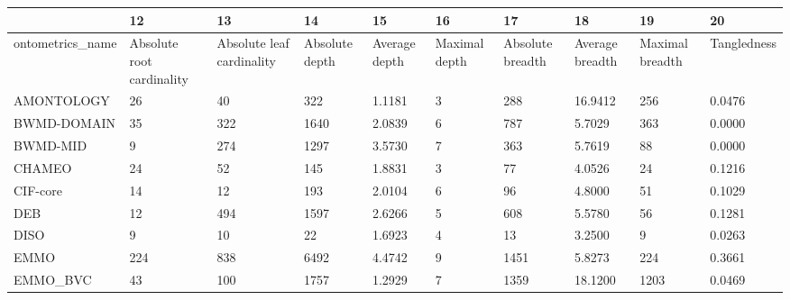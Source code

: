\begin{tabular}{llllllllll}
\toprule
{} &                         12 &                         13 &              14 &             15 &             16 &                17 &               18 &               19 &           20 \\
\midrule
ontometrics\_name        &  Absolute root cardinality &  Absolute leaf cardinality &  Absolute depth &  Average depth &  Maximal depth &  Absolute breadth &  Average breadth &  Maximal breadth &  Tangledness \\
AMONTOLOGY              &                         26 &                         40 &             322 &         1.1181 &              3 &               288 &          16.9412 &              256 &       0.0476 \\
BWMD-DOMAIN             &                         35 &                        322 &            1640 &         2.0839 &              6 &               787 &           5.7029 &              363 &       0.0000 \\
BWMD-MID                &                          9 &                        274 &            1297 &         3.5730 &              7 &               363 &           5.7619 &               88 &       0.0000 \\
CHAMEO                  &                         24 &                         52 &             145 &         1.8831 &              3 &                77 &           4.0526 &               24 &       0.1216 \\
CIF-core                &                         14 &                         12 &             193 &         2.0104 &              6 &                96 &           4.8000 &               51 &       0.1029 \\
DEB                     &                         12 &                        494 &            1597 &         2.6266 &              5 &               608 &           5.5780 &               56 &       0.1281 \\
DISO                    &                          9 &                         10 &              22 &         1.6923 &              4 &                13 &           3.2500 &                9 &       0.0263 \\
EMMO                    &                        224 &                        838 &            6492 &         4.4742 &              9 &              1451 &           5.8273 &              224 &       0.3661 \\
EMMO\_BVC                &                         43 &                        100 &            1757 &         1.2929 &              7 &              1359 &          18.1200 &             1203 &       0.0469 \\

\end{tabular}
